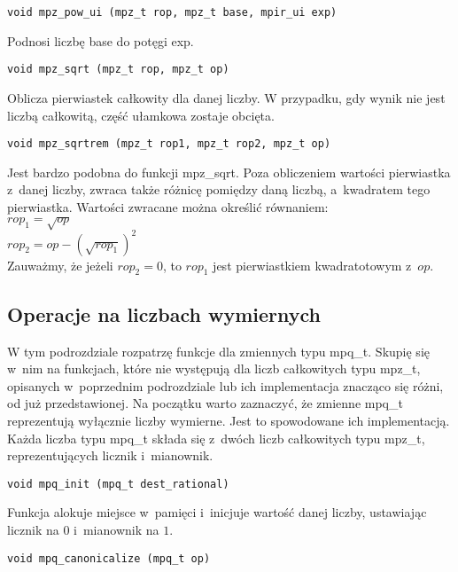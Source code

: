 \begin{lstlisting}
void mpz_pow_ui (mpz_t rop, mpz_t base, mpir_ui exp)
\end{lstlisting}

Podnosi liczbę base do potęgi exp.

\begin{lstlisting}
void mpz_sqrt (mpz_t rop, mpz_t op)
\end{lstlisting}

Oblicza pierwiastek całkowity dla danej liczby. W przypadku, gdy wynik nie jest liczbą całkowitą, część ułamkowa zostaje obcięta.

\begin{lstlisting}
void mpz_sqrtrem (mpz_t rop1, mpz_t rop2, mpz_t op)
\end{lstlisting}

Jest bardzo podobna do funkcji mpz\_sqrt. Poza obliczeniem wartości pierwiastka z~danej liczby, zwraca także różnicę pomiędzy daną liczbą, a~kwadratem tego pierwiastka. Wartości zwracane można określić równaniem: \\
$rop_1 = \sqrt{op}$ \\
$rop_2 = op - (\sqrt{rop_1})^2$ \\
Zauważmy, że jeżeli $rop_2=0$, to $rop_1$ jest pierwiastkiem kwadratotowym z~$op$.

\subsection{Operacje na liczbach wymiernych}

W tym podrozdziale rozpatrzę funkcje dla zmiennych typu mpq\_t. Skupię się w~nim na funkcjach, które nie występują dla liczb całkowitych typu mpz\_t, opisanych w~poprzednim podrozdziale lub ich implementacja znacząco się różni, od już przedstawionej.
Na początku warto zaznaczyć, że zmienne mpq\_t reprezentują wyłącznie liczby wymierne. Jest to spowodowane ich implementacją. Każda liczba typu mpq\_t składa się z~dwóch liczb całkowitych typu mpz\_t, reprezentujących licznik i~mianownik.

\begin{lstlisting}
void mpq_init (mpq_t dest_rational)
\end{lstlisting}

Funkcja alokuje miejsce w~pamięci i~inicjuje wartość danej liczby, ustawiając licznik na $0$ i~mianownik na $1$.

\begin{lstlisting}
void mpq_canonicalize (mpq_t op)
\end{lstlisting}

